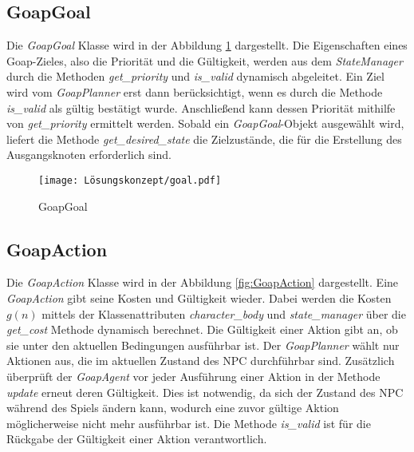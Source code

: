 \subsection{GoapGoal}
\label{chap:goapgoal uml}

Die \textit{GoapGoal} Klasse wird in der Abbildung \ref{fig:GoapGoal} dargestellt. Die Eigenschaften eines Goap-Zieles, also die Priorität und die Gültigkeit, werden aus dem \textit{StateManager} durch die Methoden \textit{get\_priority} und \textit{is\_valid} dynamisch abgeleitet. Ein Ziel wird vom \textit{GoapPlanner} erst dann berücksichtigt, wenn es durch die Methode \textit{is\_valid} als gültig bestätigt wurde. Anschlie\ss{}end kann dessen Priorität mithilfe von \textit{get\_priority} ermittelt werden. Sobald ein \textit{GoapGoal}-Objekt ausgewählt wird, liefert die Methode \textit{get\_desired\_state} die Zielzustände, die für die Erstellung des Ausgangsknoten erforderlich sind.

\begin{figure}[h]
  \centering
  \texttt{[image: Lösungskonzept/goal.pdf]}
	\captionsetup{justification=justified, format=plain}
  \caption{GoapGoal}
  \label{fig:GoapGoal}
\end{figure}







\subsection{GoapAction}
\label{chap:goapaction uml}

Die \textit{GoapAction} Klasse wird in der Abbildung \ref{fig:GoapAction} dargestellt. Eine \textit{GoapAction} gibt seine Kosten und Gültigkeit wieder. Dabei werden die Kosten $g(n)$ mittels der Klassenattributen \textit{character\_body} und \textit{state\_manager} über die \textit{get\_cost} Methode dynamisch berechnet. Die Gültigkeit einer Aktion gibt an, ob sie unter den aktuellen Bedingungen ausführbar ist. Der \textit{GoapPlanner} wählt nur Aktionen aus, die im aktuellen Zustand des NPC durchführbar sind. Zusätzlich überprüft der \textit{GoapAgent} vor jeder Ausführung einer Aktion in der Methode \textit{update} erneut deren Gültigkeit. Dies ist notwendig, da sich der Zustand des NPC während des Spiels ändern kann, wodurch eine zuvor gültige Aktion möglicherweise nicht mehr ausführbar ist. Die Methode \textit{is\_valid} ist für die Rückgabe der Gültigkeit einer Aktion verantwortlich.

